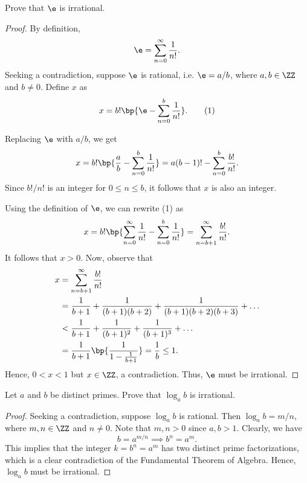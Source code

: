 \begin{problem}
    Prove that $\e$ is irrational.
\end{problem}
\begin{proof}
    By definition, \[\e = \sum_{n = 0}^\infty \frac1{n!}.\] Seeking a contradiction, suppose $\e$ is rational, i.e. $\e = a/b$, where $a, b \in \ZZ$ and $b \neq 0$. Define $x$ as \[x = b! \bp{\e - \sum_{n = 0}^b \frac1{n!}}. \tag{1}\]
    
    Replacing $\e$ with $a/b$, we get \[x = b! \bp{\frac{a}{b} - \sum_{n = 0}^b \frac1{n!}} = a(b-1)! - \sum_{n = 0}^b \frac{b!}{n!}.\] Since $b!/n!$ is an integer for $0 \leq n \leq b$, it follows that $x$ is also an integer.

    Using the definition of $\e$, we can rewrite (1) as \[x = b! \bp{\sum_{n = 0}^\infty \frac1{n!} - \sum_{n = 0}^b \frac1{n!}} = \sum_{n = b+1}^\infty \frac{b!}{n!}.\] It follows that $x > 0$. Now, observe that
    \begin{align*}
        x &= \sum_{n = b+1}^\infty \frac{b!}{n!}\\
        &= \frac1{b + 1} + \frac1{(b+1)(b+2)} + \frac1{(b+1)(b+2)(b+3)} + \dots\\
        &< \frac1{b+1} + \frac1{(b+1)^2} + \frac1{(b+1)^3} + \dots\\
        &= \frac1{b+1} \bp{\frac1{1 - \frac1{b+1}}} = \frac1b \leq 1.
    \end{align*}
    Hence, $0 < x < 1$ but $x \in \ZZ$, a contradiction. Thus, $\e$ must be irrational.
\end{proof}

\clearpage
\begin{problem}
    Let $a$ and $b$ be distinct primes. Prove that $\log_a b$ is irrational.
\end{problem}
\begin{proof}
    Seeking a contradiction, suppose $\log_a b$ is rational. Then $\log_a b = m/n$, where $m, n \in \ZZ$ and $n \neq 0$. Note that $m, n > 0$ since $a, b > 1$. Clearly, we have \[b = a^{m/n} \implies b^n = a^m.\] This implies that the integer $k = b^n = a^m$ has two distinct prime factorizations, which is a clear contradiction of the Fundamental Theorem of Algebra. Hence, $\log_a b$ must be irrational.
\end{proof}